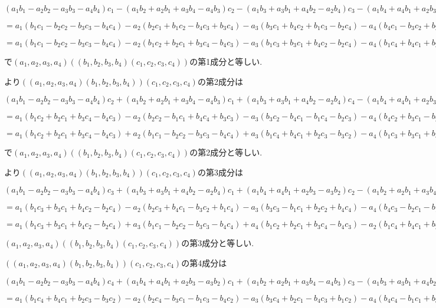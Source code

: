 \documentclass{jsarticle}
\begin{document}
$
(a_1b_1-a_2b_2-a_3b_3-a_4b_4)c_1-(a_1b_2+a_2b_1+a_3b_4-a_4b_3)c_2-(a_1b_3+a_3b_1+a_4b_2-a_2b_4)c_3-(a_1b_4+a_4b_1+a_2b_3-a_3b_2)c_4
$

$=a_1(b_1c_1-b_2c_2-b_3c_3-b_4c_4)
-a_2(b_2c_1+b_1c_2-b_4c_3+b_3c_4)
-a_3(b_3c_1+b_4c_2+b_1c_3-b_2c_4)
-a_4(b_4c_1-b_3c_2+b_2c_3+b_1c_4)
$

$=a_1(b_1c_1-b_2c_2-b_3c_3-b_4c_4)-a_2(b_1c_2+b_2c_1+b_3c_4-b_4c_3)-a_3(b_1c_3+b_3c_1+b_4c_2-b_2c_4)-
a_4(b_1c_4+b_4c_1+b_2c_3-b_3c_2)$

で$(a_1,a_2,a_3,a_4)((b_1,b_2,b_3,b_4)(c_1,c_2,c_3,c_4))$の第1成分と等しい.

より$((a_1,a_2,a_3,a_4)(b_1,b_2,b_3,b_4))(c_1,c_2,c_3,c_4)$の第2成分は

$
(a_1b_1-a_2b_2-a_3b_3-a_4b_4)c_2+(a_1b_2+a_2b_1+a_3b_4-a_4b_3)c_1+(a_1b_3+a_3b_1+a_4b_2-a_2b_4)c_4-(a_1b_4+a_4b_1+a_2b_3-a_3b_2)c_3
$

$=a_1(b_1c_2+b_2c_1+b_3c_4-b_4c_3)
-a_2(b_2c_2-b_1c_1+b_4c_4+b_3c_3)
-a_3(b_3c_2-b_4c_1-b_1c_4-b_2c_3)
-a_4(b_4c_2+b_3c_1-b_2c_4+b_1c_3)
$

$=a_1(b_1c_2+b_2c_1+b_3c_4-b_4c_3)+
a_2(b_1c_1-b_2c_2-b_3c_3-b_4c_4)+
a_3(b_1c_4+b_4c_1+b_2c_3-b_3c_2)-
a_4(b_1c_3+b_3c_1+b_4c_2-b_2c_4)$

で$(a_1,a_2,a_3,a_4)((b_1,b_2,b_3,b_4)(c_1,c_2,c_3,c_4))$の第2成分と等しい.

より$((a_1,a_2,a_3,a_4)(b_1,b_2,b_3,b_4))(c_1,c_2,c_3,c_4)$の第3成分は

$
(a_1b_1-a_2b_2-a_3b_3-a_4b_4)c_3+(a_1b_3+a_3b_1+a_4b_2-a_2b_4)c_1+(a_1b_4+a_4b_1+a_2b_3-a_3b_2)c_2-(a_1b_2+a_2b_1+a_3b_4-a_4b_3)c_4
$

$=a_1(b_1c_3+b_3c_1+b_4c_2-b_2c_4)
-a_2(b_2c_3+b_4c_1-b_3c_2+b_1c_4)
-a_3(b_3c_3-b_1c_1+b_2c_2+b_4c_4)
-a_4(b_4c_3-b_2c_1-b_1c_2-b_3c_4)
$

$=a_1(b_1c_3+b_3c_1+b_4c_2-b_2c_4)+
a_3(b_1c_1-b_2c_2-b_3c_3-b_4c_4)+
a_4(b_1c_2+b_2c_1+b_3c_4-b_4c_3)-
a_2(b_1c_4+b_4c_1+b_2c_3-b_3c_2)$

$(a_1,a_2,a_3,a_4)((b_1,b_2,b_3,b_4)(c_1,c_2,c_3,c_4))$の第3成分と等しい.

$((a_1,a_2,a_3,a_4)(b_1,b_2,b_3,b_4))(c_1,c_2,c_3,c_4)$の第4成分は

$
(a_1b_1-a_2b_2-a_3b_3-a_4b_4)c_4+(a_1b_4+a_4b_1+a_2b_3-a_3b_2)c_1+(a_1b_2+a_2b_1+a_3b_4-a_4b_3)c_3-(a_1b_3+a_3b_1+a_4b_2-a_2b_4)c_2
$

$=a_1(b_1c_4+b_4c_1+b_2c_3-b_3c_2)
-a_2(b_2c_4-b_3c_1-b_1c_3-b_4c_2)
-a_3(b_3c_4+b_2c_1-b_4c_3+b_1c_2)
-a_4(b_4c_4-b_1c_1+b_3c_3+b_2c_2)
$
\end{document}
